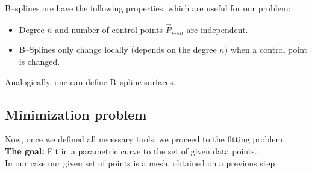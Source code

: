 B--splines are have the following properties, which are useful for our problem:
\begin{itemize}
\item Degree $n$ and number of control points $\vec{P}_{i\cdots m}$ are independent.
\item B--Splines only change locally (depends on the degree $n$) when a control point is changed.
\end{itemize}

Analogically, one can define B--spline surfaces.
\subsection{Minimization problem}
Now, once we defined all necessary tools, we proceed to the fitting problem.\\
\textbf{The goal:} Fit in a parametric curve to the set of given data points. \\
In our case our given set of points is a mesh, obtained on a previous step.
